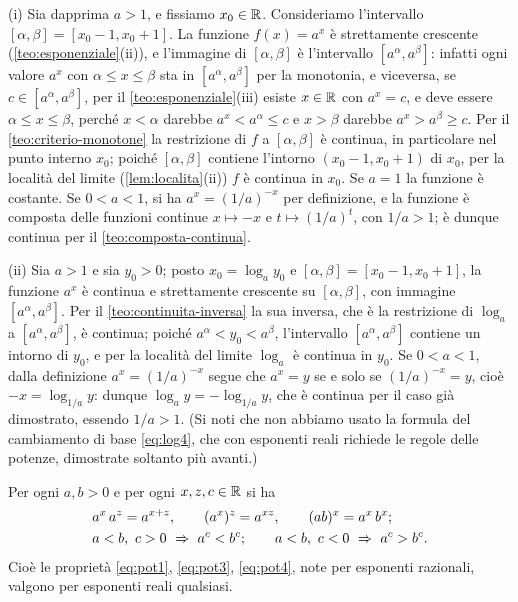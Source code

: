 \begin{dimostrazione}[Dimostrazione di (i) e (ii)]
(i) Sia dapprima $a>1$, e fissiamo $x_{0}\in\mathbb{R}$. Consideriamo l'intervallo
$[\alpha,\beta]=[x_{0}-1,x_{0}+1]$. La funzione $f(x)=a^{x}$ è strettamente crescente
(\cref{teo:esponenziale}(ii)), e l'immagine di $[\alpha,\beta]$ è l'intervallo
$[a^{\alpha},a^{\beta}]$: infatti ogni valore $a^{x}$ con $\alpha\le x\le\beta$ sta in
$[a^{\alpha},a^{\beta}]$ per la monotonia, e viceversa, se $c\in[a^{\alpha},a^{\beta}]$,
per il \cref{teo:esponenziale}(iii) esiste $x\in\mathbb{R}$ con $a^{x}=c$, e deve essere
$\alpha\le x\le\beta$, perché $x<\alpha$ darebbe $a^{x}<a^{\alpha}\le c$ e $x>\beta$
darebbe $a^{x}>a^{\beta}\ge c$. Per il \cref{teo:criterio-monotone} la restrizione di
$f$ a $[\alpha,\beta]$ è continua, in particolare nel punto interno $x_{0}$; poiché
$[\alpha,\beta]$ contiene l'intorno $(x_{0}-1,x_{0}+1)$ di $x_{0}$, per la località del
limite (\cref{lem:localita}(ii)) $f$ è continua in $x_{0}$. Se $a=1$ la funzione è
costante. Se $0<a<1$, si ha $a^{x}=(1/a)^{-x}$ per definizione, e la funzione è
composta delle funzioni continue $x\mapsto-x$ e $t\mapsto(1/a)^{t}$, con $1/a>1$; è
dunque continua per il \cref{teo:composta-continua}.

(ii) Sia $a>1$ e sia $y_{0}>0$; posto $x_{0}=\log_{a}y_{0}$ e
$[\alpha,\beta]=[x_{0}-1,x_{0}+1]$, la funzione $a^{x}$ è continua e strettamente
crescente su $[\alpha,\beta]$, con immagine $[a^{\alpha},a^{\beta}]$. Per il
\cref{teo:continuita-inversa} la sua inversa, che è la restrizione di $\log_{a}$ a
$[a^{\alpha},a^{\beta}]$, è continua; poiché $a^{\alpha}<y_{0}<a^{\beta}$, l'intervallo
$[a^{\alpha},a^{\beta}]$ contiene un intorno di $y_{0}$, e per la località del limite
$\log_{a}$ è continua in $y_{0}$. Se $0<a<1$, dalla definizione $a^{x}=(1/a)^{-x}$ segue che
$a^{x}=y$ se e solo se $(1/a)^{-x}=y$, cioè $-x=\log_{1/a}y$: dunque
$\log_{a}y=-\log_{1/a}y$, che è continua per il caso già dimostrato, essendo $1/a>1$.
(Si noti che non abbiamo usato la formula del cambiamento di base \eqref{eq:log4}, che
con esponenti reali richiede le regole delle potenze, dimostrate soltanto più avanti.)
\end{dimostrazione}

\begin{teorema}\label{teo:potenze-reali}
Per ogni $a,b>0$ e per ogni $x,z,c\in\mathbb{R}$ si ha
\begin{align}
  &a^{x}\,a^{z}=a^{x+z}, \qquad (a^{x})^{z}=a^{xz}, \qquad (ab)^{x}=a^{x}\,b^{x};
  \label{eq:potenze-reali-algebra}\\
  &a<b,\ c>0 \ \implica\ a^{c}<b^{c}; \qquad a<b,\ c<0 \ \implica\ a^{c}>b^{c} .
  \label{eq:potenze-reali-ordine}
\end{align}
Cioè le proprietà \eqref{eq:pot1}, \eqref{eq:pot3}, \eqref{eq:pot4}, note per esponenti
razionali, valgono per esponenti reali qualsiasi.
\end{teorema}

